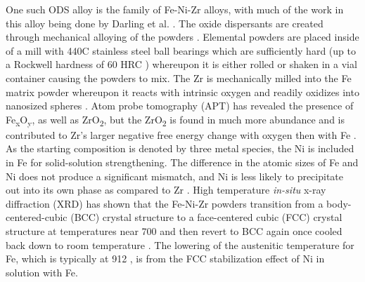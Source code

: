 	One such ODS alloy is the family of Fe-Ni-Zr alloys, with much of the work in this alloy being done by Darling et al. \cite{RN740,RN243,RN1376,RN291,RN1247,RN476,RN550,RN966}. The oxide dispersants are created through mechanical alloying of the powders \cite{RN1177}. Elemental powders are placed inside of a mill with 440C stainless steel ball bearings which are sufficiently hard (up to a Rockwell hardness of 60 HRC \cite{RN3431}) whereupon it is either rolled or shaken in a vial container causing the powders to mix. The Zr is mechanically milled into the Fe matrix powder whereupon it reacts with intrinsic oxygen and readily oxidizes into nanosized spheres \cite{RN740}. Atom probe tomography (APT) has revealed the presence of Fe\textsubscript{x}O\textsubscript{y}, as well as ZrO\textsubscript{2}, but the ZrO\textsubscript{2} is found in much more abundance and is contributed to Zr’s larger negative free energy change with oxygen then with Fe \cite{RN740,RN267}. As the starting composition is denoted by three metal species, the Ni is included in Fe for solid-solution strengthening. The difference in the atomic sizes of Fe and Ni does not produce a significant mismatch, and Ni is less likely to precipitate out into its own phase as compared to Zr \cite{RN476}. High temperature \textit{in-situ} x-ray diffraction (XRD) has shown that the Fe-Ni-Zr powders transition from a body-centered-cubic (BCC) crystal structure to a face-centered cubic (FCC) crystal structure at temperatures near 700 \celsius{} and then revert to BCC again once cooled back down to room temperature \cite{RN550}. The lowering of the austenitic temperature for Fe, which is typically at 912 \celsius{}, is from the FCC stabilization effect of Ni in solution with Fe.
	
